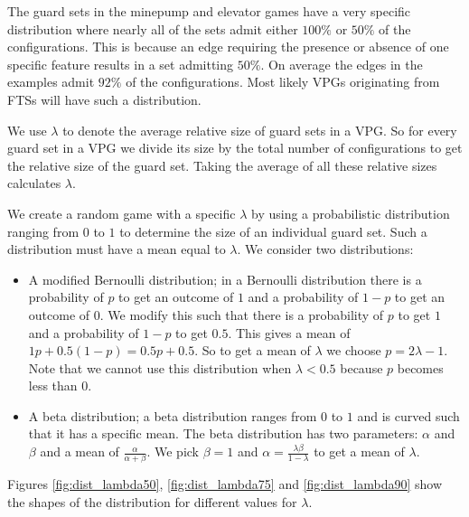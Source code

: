 The guard sets in the minepump and elevator games have a very specific distribution where nearly all of the sets admit either $100\%$ or $50\%$ of the configurations. This is because an edge requiring the presence or absence of one specific feature results in a set admitting $50\%$. On average the edges in the examples admit $92\%$ of the configurations. Most likely VPGs originating from FTSs will have such a distribution.

We use $\lambda$ to denote the average relative size of guard sets in a VPG. So for every guard set in a VPG we divide its size by the total number of configurations to get the relative size of the guard set. Taking the average of all these relative sizes calculates $\lambda$.

We create a random game with a specific $\lambda$ by using a probabilistic distribution ranging from $0$ to $1$ to determine the size of an individual guard set. Such a distribution must have a mean equal to $\lambda$. We consider two distributions:
\begin{itemize}
	\item A modified Bernoulli distribution; in a Bernoulli distribution there is a probability of $p$ to get an outcome of $1$ and a probability of $1-p$ to get an outcome of $0$. We modify this such that there is a probability of $p$ to get $1$ and a probability of $1-p$ to get $0.5$. This gives a mean of $1p + 0.5(1-p) = 0.5p + 0.5$. So to get a mean of $\lambda$ we choose $p = 2\lambda - 1$. Note that we cannot use this distribution when $\lambda < 0.5$ because $p$ becomes less than $0$.
	\item A beta distribution; a beta distribution ranges from $0$ to $1$ and is curved such that it has a specific mean. The beta distribution has two parameters: $\alpha$ and $\beta$ and a mean of $\frac{\alpha}{\alpha+\beta}$. We pick $\beta=1$ and $\alpha = \frac{\lambda\beta}{1-\lambda}$ to get a mean of $\lambda$.
\end{itemize}
Figures \ref{fig:dist_lambda50}, \ref{fig:dist_lambda75} and \ref{fig:dist_lambda90} show the shapes of the distribution for different values for $\lambda$.
